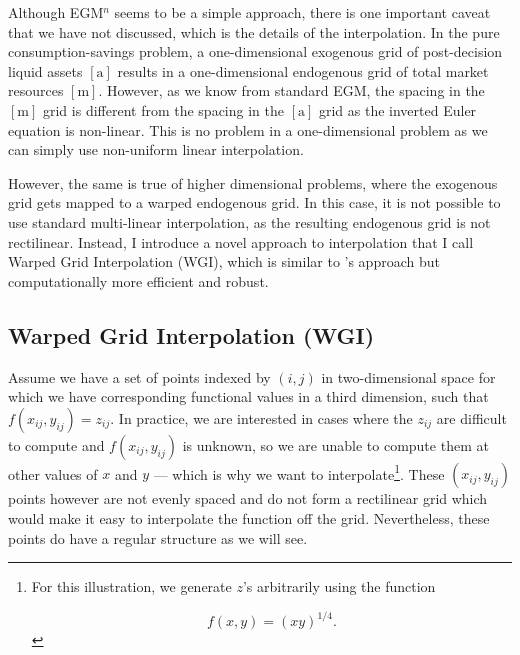 \documentclass{article}
\newcommand{\aMat}{[\mathrm{a}]}
\newcommand{\mMat}{[\mathrm{m}]}
\begin{document}
Although EGM$^n$ seems to be a simple approach, there is one important caveat that we have not discussed, which is the details of the interpolation. In the pure consumption-savings problem, a one-dimensional exogenous grid of post-decision liquid assets $\aMat$ results in a one-dimensional endogenous grid of total market resources $\mMat$. However, as we know from standard EGM, the spacing in the $\mMat$ grid is different from the spacing in the $\aMat$ grid as the inverted Euler equation is non-linear. This is no problem in a one-dimensional problem as we can simply use non-uniform linear interpolation.

However, the same is true of higher dimensional problems, where the exogenous grid gets mapped to a warped endogenous grid. In this case, it is not possible to use standard multi-linear interpolation, as the resulting endogenous grid is not rectilinear. Instead, I introduce a novel approach to interpolation that I call Warped Grid Interpolation (WGI), which is similar to \citet{White2015}'s approach but computationally more efficient and robust.


\subsection{Warped Grid Interpolation (WGI)}\label{Warped Grid Interpolation (WGI)}

Assume we have a set of points indexed by $(i,j)$ in two-dimensional space for which we have corresponding functional values in a third dimension, such that $f(x_{ij},y_{ij}) = z_{ij}$. In practice, we are interested in cases where the $z_{ij}$ are difficult to compute and $f(x_{ij},y_{ij})$ is unknown, so we are unable to compute them at other values of $x$ and $y$ --- which is why we want to interpolate\footnote{For this illustration, we generate $z$'s arbitrarily using the function

\begin{equation}
f(x,y) = (xy)^{1/4}.
\end{equation}}. These $(x_{ij},y_{ij})$ points however are not evenly spaced and do not form a rectilinear grid which would make it easy to interpolate the function off the grid. Nevertheless, these points do have a regular structure as we will see.
\end{document}
